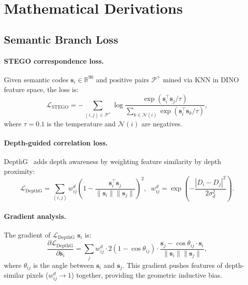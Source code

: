 \documentclass[10pt,twocolumn,letterpaper]{article}
\begin{document}
\section{Mathematical Derivations}
\label{sec:supp_math}

\subsection{Semantic Branch Loss}
\label{sec:supp_semantic_loss}

\paragraph{STEGO correspondence loss.}
Given semantic codes $\mathbf{s}_i \in \mathbb{R}^{90}$ and positive pairs $\mathcal{P}^+$ mined via KNN in DINO feature space, the loss is:
\begin{equation}
\mathcal{L}_{\text{STEGO}} = -\sum_{(i,j) \in \mathcal{P}^+} \log \frac{\exp(\mathbf{s}_i^\top \mathbf{s}_j / \tau)}{\sum_{k \in \mathcal{N}(i)} \exp(\mathbf{s}_i^\top \mathbf{s}_k / \tau)},
\end{equation}
where $\tau = 0.1$ is the temperature and $\mathcal{N}(i)$ are negatives.

\paragraph{Depth-guided correlation loss.}
DepthG~\cite{sick2024depthg} adds depth awareness by weighting feature similarity by depth proximity:
\begin{equation}
\mathcal{L}_{\text{DepthG}} = \sum_{(i,j)} w_{ij}^d \left(1 - \frac{\mathbf{s}_i^\top \mathbf{s}_j}{\|\mathbf{s}_i\| \|\mathbf{s}_j\|}\right)^{\!2},\;\;
w_{ij}^d = \exp\!\left(-\frac{|D_i - D_j|^2}{2\sigma_d^2}\right)\!.
\end{equation}

\paragraph{Gradient analysis.}
The gradient of $\mathcal{L}_{\text{DepthG}}$ \wrt $\mathbf{s}_i$ is:
\begin{equation}
\frac{\partial \mathcal{L}_{\text{DepthG}}}{\partial \mathbf{s}_i} = \sum_j w_{ij}^d \cdot 2(1 - \cos\theta_{ij}) \cdot \frac{\mathbf{s}_j - \cos\theta_{ij} \cdot \mathbf{s}_i}{\|\mathbf{s}_i\| \|\mathbf{s}_j\|},
\end{equation}
where $\theta_{ij}$ is the angle between $\mathbf{s}_i$ and $\mathbf{s}_j$. This gradient pushes features of depth-similar pixels ($w_{ij}^d \to 1$) together, providing the geometric inductive bias.
\end{document}
